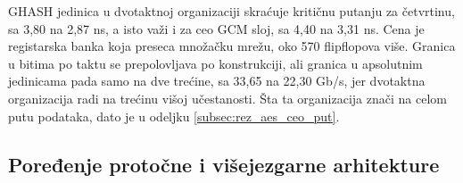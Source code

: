 \begin{table}[H]
\caption{GHASH jedinica i GCM sloj, implementacija van konteksta}
\centering
{\renewcommand{\arraystretch}{1.25}
}
\label{tab:ghash_impl}
\end{table}

GHASH jedinica u dvotaktnoj organizaciji skraćuje kritičnu putanju za četvrtinu, sa 3,80 na 2,87 ns, a isto važi i za ceo GCM sloj, sa 4,40 na 3,31 ns. Cena je registarska banka koja preseca množačku mrežu, oko 570 flipflopova više. Granica u bitima po taktu se prepolovljava po konstrukciji, ali granica u apsolutnim jedinicama pada samo na dve trećine, sa 33,65 na 22,30 Gb/s, jer dvotaktna organizacija radi na trećinu višoj učestanosti. Šta ta organizacija znači na celom putu podataka, dato je u odeljku \ref{subsec:rez_aes_ceo_put}.

\subsection{Poređenje protočne i višejezgarne arhitekture}
\label{subsec:rez_aes_arhitekture}

